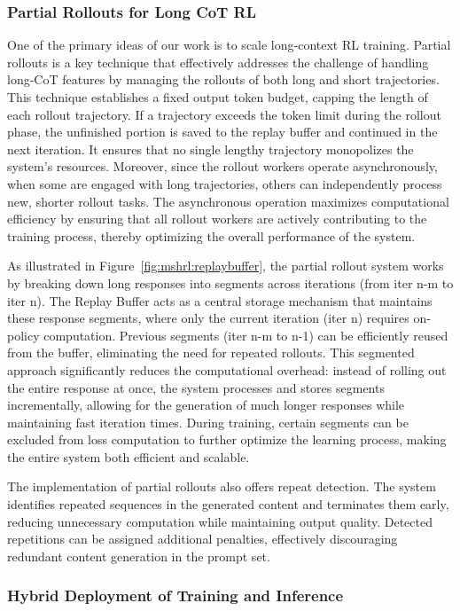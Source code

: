 \documentclass{article}
\begin{document}
\subsubsection{Partial Rollouts for Long CoT RL}
One of the primary ideas of our work is to scale long-context RL training. Partial rollouts is a key technique that effectively addresses the challenge of handling long-CoT features by managing the rollouts of both long and short trajectories. This technique establishes a fixed output token budget, capping the length of each rollout trajectory. If a trajectory exceeds the token limit during the rollout phase, the unfinished portion is saved to the replay buffer and continued in the next iteration. It ensures that no single lengthy trajectory monopolizes the system's resources. Moreover, since the rollout workers operate asynchronously, when some are engaged with long trajectories, others can independently process new, shorter rollout tasks. The asynchronous operation maximizes computational efficiency by ensuring that all rollout workers are actively contributing to the training process, thereby optimizing the overall performance of the system.

As illustrated in Figure~\ref{fig:mshrl:replaybuffer}, the partial rollout system works by breaking down long responses into segments across iterations (from iter n-m to iter n). The Replay Buffer acts as a central storage mechanism that maintains these response segments, where only the current iteration (iter n) requires on-policy computation. Previous segments (iter n-m to n-1) can be efficiently reused from the buffer, eliminating the need for repeated rollouts. This segmented approach significantly reduces the computational overhead: instead of rolling out the entire response at once, the system processes and stores segments incrementally, allowing for the generation of much longer responses while maintaining fast iteration times. During training, certain segments can be excluded from loss computation to further optimize the learning process, making the entire system both efficient and scalable.


The implementation of partial rollouts also offers repeat detection. The system identifies repeated sequences in the generated content and terminates them early, reducing unnecessary computation while maintaining output quality. 
Detected repetitions can be assigned additional penalties, effectively discouraging redundant content generation in the prompt set.


\subsubsection{Hybrid Deployment of Training and Inference}
\end{document}
